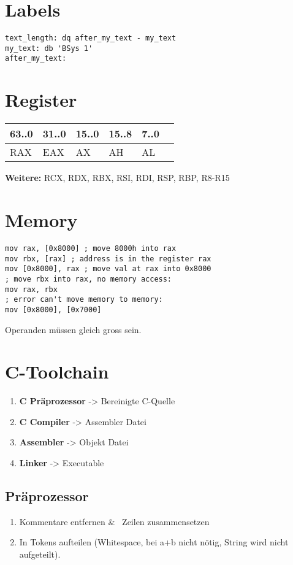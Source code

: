 \begin{multicols*}{4}
\section{Labels}
\begin{lstlisting}[language={[x86masm]Assembler}]
text_length: dq after_my_text - my_text
my_text: db 'BSys 1'
after_my_text:
\end{lstlisting}

\section{Register}
\begin{tabular}{llllll}
    63..0 & 31..0 & 15..0 & 15..8 & 7..0\\
    \hline
    RAX & EAX & AX & AH & AL\\
\end{tabular}

\textbf{Weitere:} RCX, RDX, RBX, RSI, RDI, RSP, RBP, R8-R15

\section{Memory}
\begin{lstlisting}[language={[x86masm]Assembler}]
mov rax, [0x8000] ; move 8000h into rax
mov rbx, [rax] ; address is in the register rax
mov [0x8000], rax ; move val at rax into 0x8000
; move rbx into rax, no memory access:
mov rax, rbx
; error can't move memory to memory:
mov [0x8000], [0x7000]
\end{lstlisting}
Operanden müssen gleich gross sein.


\section{C-Toolchain}
\begin{enumerate}
    \item \textbf{C Präprozessor} -> Bereinigte C-Quelle
    \item \textbf{C Compiler} -> Assembler Datei
    \item \textbf{Assembler} -> Objekt Datei
    \item \textbf{Linker} -> Executable
\end{enumerate}
\subsection{Präprozessor}
\begin{enumerate}
    \item Kommentare entfernen \& \ Zeilen zusammensetzen
    \item In Tokens aufteilen (Whitespace, bei a+b nicht nötig, String wird nicht aufgeteilt).


\end{enumerate}
\end{multicols*}
